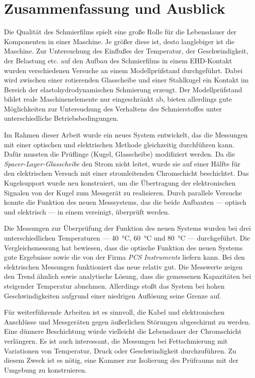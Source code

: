 \chapter{Zusammenfassung und Ausblick}
\label{zusammenfassung_und_ausblick}

Die Qualität des Schmierfilms spielt eine große Rolle für die Lebensdauer der Komponenten in einer Maschine.
Je größer diese ist, desto langlebiger ist die Maschine.
Zur Untersuchung des Einflußes der Temperatur, der Geschwindigkeit, der Belastung etc. auf den Aufbau des Schmierfilms in einem EHD-Kontakt wurden verschiedenen Versuche an einem Modellprüfstand durchgeführt.
Dabei wird zwischen einer rotierenden Glasscheibe und einer Stahlkugel ein Kontakt im Bereich der elastohydrodynamischen Schmierung erzeugt.
Der Modellprüfstand bildet reale Maschinenelemente nur eingeschränkt ab, bieten allerdings gute Möglichkeiten zur Untersuchung des Verhaltens des Schmierstoffes unter unterschiedliche Betriebsbedingungen.

Im Rahmen dieser Arbeit wurde ein neues System entwickelt, das die Messungen mit einer optischen und elektrischen Methode gleichzeitig durchführen kann.
Dafür mussten die Prüflinge (Kugel, Glasscheibe) modifiziert werden.
Da die \textit{Spacer-Layer-Glasscheibe} den Strom nicht leitet, wurde sie auf einer Hälfte für den elektrischen Versuch mit einer stromleitenden Chromschicht beschichtet.
Das Kugelsupport wurde neu konstruiert, um die Übertragung der elektronischen Signalen von der Kugel zum Messgerät zu realisieren.
Durch parallele Versuche konnte die Funktion des neuen Messsystems, das die beide Aufbauten --- optisch und elektrisch --- in einem vereinigt, überprüft werden.

Die Messungen zur Überprüfung der Funktion des neuen Systems wurden bei drei unterschiedlichen Temperaturen --- \SI{40}{\degreeCelsius}, \SI{60}{\degreeCelsius} und \SI{80}{\degreeCelsius} --- durchgeführt.
Die Vergleichsmessung hat bewiesen, dass die optische Funktion des neuen Systems gute Ergebnisse sowie die von der Firma \textit{PCS Instruments} liefern kann.
Bei den elektrischen Messungen funktioniert das neue relativ gut.
Die Messwerte zeigen den Trend ähnlich sowie analytische Lösung, dass die gemessenen Kapazitäten bei steigender Temperatur abnehmen.
Allerdings stoßt das System bei hohen Geschwindigkeiten aufgrund einer niedrigen Auflösung seine Grenze auf.

Für weiterführende Arbeiten ist es sinnvoll, die Kabel und elektronischen Anschlüsse und Messgeräten gegen äußerlichen Störungen abgeschirmt zu werden.
Eine dünnere Beschichtung würde vielleicht die Lebensdauer der Chromschicht verlängern.
Es ist auch interessant, die Messungen bei Fettschmierung mit Variationen von Temperatur, Druck oder Geschwindigkeit durchzuführen.
Zu diesem Zweck ist es nötig, eine Kammer zur Isolierung des Prüfraums mit der Umgebung zu konstruieren.

